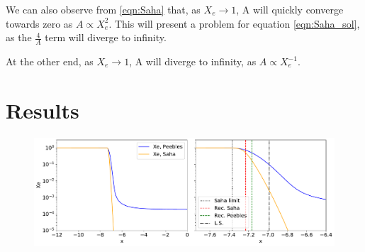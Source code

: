 \documentclass[10pt, a4paper]{article}
\begin{document}
We can also observe from \ref{eqn:Saha} that, as $X_e \rightarrow 1$, A will quickly converge towards zero as $A \propto X_e^2$. This will present a problem for equation \ref{eqn:Saha_sol}, as the $\frac{4}{A}$ term will diverge to infinity.

At the other end, as $X_e \rightarrow 1$, A will diverge to infinity, as $A \propto X_e^{-1}$.


\section{Results}
\begin{figure}[H]
    \centering
    \includegraphics[scale=0.5]{../m2_figs/Xe.pdf}
    \caption{}
    \label{}
\end{figure}




\end{document}
